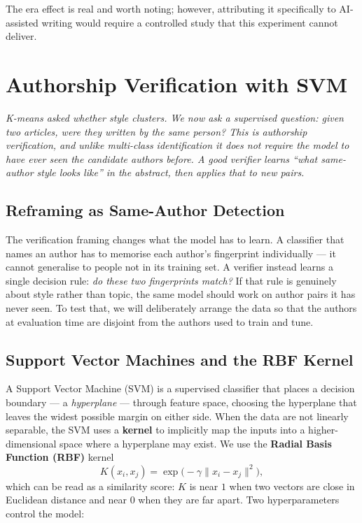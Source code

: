 \documentclass[11pt]{article}
\begin{document}
The era effect is real and worth noting; however, attributing it specifically
to AI-assisted writing would require a controlled study that this experiment
cannot deliver.

\section{Authorship Verification with SVM}
\label{sec:svm}

\textit{K-means asked whether style \emph{clusters}. We now ask a
supervised question: given two articles, were they written by the same person?
This is authorship verification, and unlike multi-class identification it does
not require the model to have ever seen the candidate authors before. A good
verifier learns ``what same-author style looks like'' in the abstract, then
applies that to new pairs.}

\subsection{Reframing as Same-Author Detection}

The verification framing changes what the model has to learn. A classifier
that names an author has to memorise each author's fingerprint individually
--- it cannot generalise to people not in its training set. A verifier instead
learns a single decision rule: \textit{do these two fingerprints match?} If
that rule is genuinely about style rather than topic, the same model should
work on author pairs it has never seen. To test that, we will deliberately
arrange the data so that the authors at evaluation time are disjoint from
the authors used to train and tune.

\subsection{Support Vector Machines and the RBF Kernel}

A Support Vector Machine (SVM) is a supervised classifier that places a
decision boundary --- a \emph{hyperplane} --- through feature space, choosing
the hyperplane that leaves the widest possible margin on either side. When the
data are not linearly separable, the SVM uses a \textbf{kernel} to implicitly
map the inputs into a higher-dimensional space where a hyperplane may exist.
We use the \textbf{Radial Basis Function (RBF)} kernel
\[
  K(x_{i},x_{j}) = \exp\!\bigl(-\gamma \lVert x_{i}-x_{j} \rVert^{2}\bigr),
\]
which can be read as a similarity score: $K$ is near $1$ when two vectors are
close in Euclidean distance and near $0$ when they are far apart. Two
hyperparameters control the model:
\end{document}
